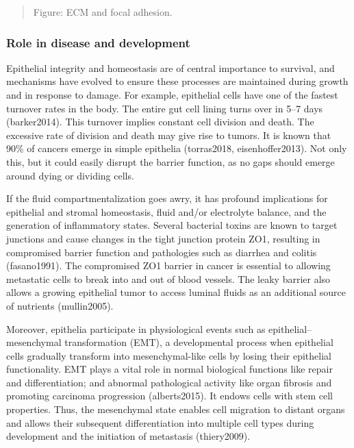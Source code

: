 \documentclass[
]{article}
\begin{document}
\begin{quote}
Figure: ECM and focal adhesion.
\end{quote}

\hypertarget{role-in-disease-and-development}{%
\subsubsection{Role in disease and
development}\label{role-in-disease-and-development}}

Epithelial integrity and homeostasis are of central importance to
survival, and mechanisms have evolved to ensure these processes are
maintained during growth and in response to damage. For example,
epithelial cells have one of the fastest turnover rates in the body. The
entire gut cell lining turns over in 5--7 days (barker2014). This
turnover implies constant cell division and death. The excessive rate of
division and death may give rise to tumors. It is known that 90\% of
cancers emerge in simple epithelia (torras2018, eisenhoffer2013). Not
only this, but it could easily disrupt the barrier function, as no gaps
should emerge around dying or dividing cells.

If the fluid compartmentalization goes awry, it has profound
implications for epithelial and stromal homeostasis, fluid and/or
electrolyte balance, and the generation of inflammatory states. Several
bacterial toxins are known to target junctions and cause changes in the
tight junction protein ZO1, resulting in compromised barrier function
and pathologies such as diarrhea and colitis (fasano1991). The
compromised ZO1 barrier in cancer is essential to allowing metastatic
cells to break into and out of blood vessels. The leaky barrier also
allows a growing epithelial tumor to access luminal fluids as an
additional source of nutrients (mullin2005).

Moreover, epithelia participate in physiological events such as
epithelial--mesenchymal transformation (EMT), a developmental process
when epithelial cells gradually transform into mesenchymal-like cells by
losing their epithelial functionality. EMT plays a vital role in normal
biological functions like repair and differentiation; and abnormal
pathological activity like organ fibrosis and promoting carcinoma
progression (alberts2015). It endows cells with stem cell properties.
Thus, the mesenchymal state enables cell migration to distant organs and
allows their subsequent differentiation into multiple cell types during
development and the initiation of metastasis (thiery2009).
\end{document}
